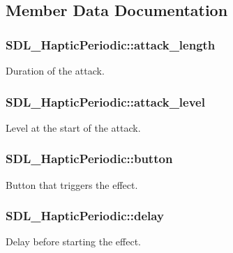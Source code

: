 \subsection{Member Data Documentation}
\subsubsection[{\texorpdfstring{attack\+\_\+length}{attack_length}}]{ S\+D\+L\+\_\+\+Haptic\+Periodic\+::attack\+\_\+length}\hypertarget{struct_s_d_l___haptic_periodic_ab35eedce7107edc75640586159fe75bb}{}\label{struct_s_d_l___haptic_periodic_ab35eedce7107edc75640586159fe75bb}
Duration of the attack. 
\subsubsection[{\texorpdfstring{attack\+\_\+level}{attack_level}}]{ S\+D\+L\+\_\+\+Haptic\+Periodic\+::attack\+\_\+level}\hypertarget{struct_s_d_l___haptic_periodic_a79fc2217fea6db6ab3d89ad905d52ccb}{}\label{struct_s_d_l___haptic_periodic_a79fc2217fea6db6ab3d89ad905d52ccb}
Level at the start of the attack. 
\subsubsection[{\texorpdfstring{button}{button}}]{ S\+D\+L\+\_\+\+Haptic\+Periodic\+::button}\hypertarget{struct_s_d_l___haptic_periodic_a9e0177354f4a285b8c98e4a31cd31752}{}\label{struct_s_d_l___haptic_periodic_a9e0177354f4a285b8c98e4a31cd31752}
Button that triggers the effect. 
\subsubsection[{\texorpdfstring{delay}{delay}}]{ S\+D\+L\+\_\+\+Haptic\+Periodic\+::delay}\hypertarget{struct_s_d_l___haptic_periodic_a8688d1c7ee6270ed290f6b474aef5ec9}{}\label{struct_s_d_l___haptic_periodic_a8688d1c7ee6270ed290f6b474aef5ec9}
Delay before starting the effect. 
